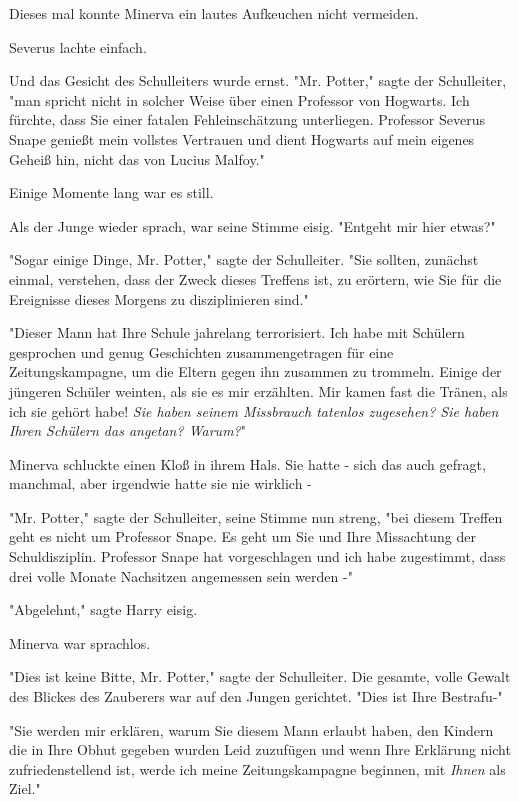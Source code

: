 {Dieses mal konnte Minerva ein lautes Aufkeuchen nicht vermeiden.

Severus lachte einfach.

Und das Gesicht des Schulleiters wurde ernst. "Mr. Potter," sagte der Schulleiter, "man spricht nicht in solcher Weise über einen Professor von Hogwarts. Ich fürchte, dass Sie einer fatalen Fehleinschätzung unterliegen. Professor Severus Snape genießt mein vollstes Vertrauen und dient Hogwarts auf mein eigenes Geheiß hin, nicht das von Lucius Malfoy."

Einige Momente lang war es still.

Als der Junge wieder sprach, war seine Stimme eisig. "Entgeht mir hier etwas?"

"Sogar einige Dinge, Mr. Potter," sagte der Schulleiter. "Sie sollten, zunächst einmal, verstehen, dass der Zweck dieses Treffens ist, zu erörtern, wie Sie für die Ereignisse dieses Morgens zu disziplinieren sind."

"Dieser Mann hat Ihre Schule jahrelang terrorisiert. Ich habe mit Schülern gesprochen und genug Geschichten zusammengetragen für eine Zeitungskampagne, um die Eltern gegen ihn zusammen zu trommeln. Einige der jüngeren Schüler weinten, als sie es mir erzählten. Mir kamen fast die Tränen, als ich sie gehört habe! \emph{Sie haben seinem Missbrauch tatenlos zugesehen? Sie haben Ihren Schülern das angetan? Warum?}"

Minerva schluckte einen Kloß in ihrem Hals. Sie hatte - sich das auch gefragt, manchmal, aber irgendwie hatte sie nie wirklich -

"Mr. Potter," sagte der Schulleiter, seine Stimme nun streng, "bei diesem Treffen geht es nicht um Professor Snape. Es geht um Sie und Ihre Missachtung der Schuldisziplin. Professor Snape hat vorgeschlagen und ich habe zugestimmt, dass drei volle Monate Nachsitzen angemessen sein werden -"

"Abgelehnt," sagte Harry eisig.

Minerva war sprachlos.

"Dies ist keine Bitte, Mr. Potter," sagte der Schulleiter. Die gesamte, volle Gewalt des Blickes des Zauberers war auf den Jungen gerichtet. "Dies ist Ihre Bestrafu-"

"Sie werden mir erklären, warum Sie diesem Mann erlaubt haben, den Kindern die in Ihre Obhut gegeben wurden Leid zuzufügen und wenn Ihre Erklärung nicht zufriedenstellend ist, werde ich meine Zeitungskampagne beginnen, mit \emph{Ihnen} als Ziel."

}

